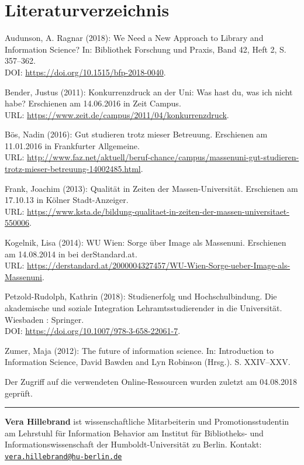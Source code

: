 \documentclass[a4paper,
fontsize=11pt,
oneside,
numbers=noperiodatend,
parskip=half-,
bibliography=totoc,
final
]{scrartcl}
\begin{document}
\hypertarget{literaturverzeichnis}{%
\section{Literaturverzeichnis}\label{literaturverzeichnis}}

Audunson, A. Ragnar (2018): We Need a New Approach to Library and
Information Science? In: Bibliothek Forschung und Praxis, Band 42, Heft
2, S. 357--362.\\
DOI: \url{https://doi.org/10.1515/bfp-2018-0040}.

Bender, Justus (2011): Konkurrenzdruck an der Uni: Was hast du, was ich
nicht habe? Erschienen am 14.06.2016 in Zeit Campus.\\
URL: \url{https://www.zeit.de/campus/2011/04/konkurrenzdruck}.

Bös, Nadin (2016): Gut studieren trotz mieser Betreuung. Erschienen am
11.01.2016 in Frankfurter Allgemeine. \\
URL:
\url{http://www.faz.net/aktuell/beruf-chance/campus/massenuni-gut-studieren-trotz-mieser-betreuung-14002485.html}.

Frank, Joachim (2013): Qualität in Zeiten der Massen-Universität.
Erschienen am 17.10.13 in Kölner Stadt-Anzeiger.\\
URL:
\href{https://www.ksta.de/bildung-qualitaet-in-zeiten-der-massen-universitaet-5500068}{https://www.ksta.de/bildung-qualitaet-in-zeiten-der-massen-universitaet-550006}.

Kogelnik, Lisa (2014): WU Wien: Sorge über Image als Massenuni.
Erschienen am 14.08.2014 in bei derStandard.at.\\
URL:
\url{https://derstandard.at/2000004327457/WU-Wien-Sorge-ueber-Image-als-Massenuni}.

Petzold-Rudolph, Kathrin (2018): Studienerfolg und Hochschulbindung. Die
akademische und soziale Integration Lehramtsstudierender in die
Universität. Wiesbaden : Springer.\\
DOI: \url{https://doi.org/10.1007/978-3-658-22061-7}.

Zumer, Maja (2012): The future of information science. In: Introduction
to Information Science, David Bawden and Lyn Robinson (Hrsg.). S.
XXIV--XXV.

Der Zugriff auf die verwendeten Online-Ressourcen wurden zuletzt am
04.08.2018 geprüft.

\begin{center}\rule{0.5\linewidth}{\linethickness}\end{center}

\textbf{Vera Hillebrand} ist wissenschaftliche Mitarbeiterin und
Promotionsstudentin am Lehrstuhl für Information Behavior am Institut
für Bibliotheks- und Informationswissenschaft der Humboldt-Universität
zu Berlin. Kontakt:
\href{mailto:vera.hillebrand@hu-berlin.de}{\nolinkurl{vera.hillebrand@hu-berlin.de}}
\end{document}
